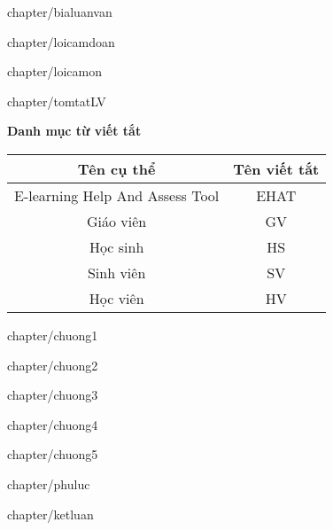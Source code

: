 \documentclass[12pt, a4paper, reqno, oneside]{report}
\begin{document}
	\makeatletter
	\renewcommand{\ps@myheadings}{
		\renewcommand{\@oddhead}{\textsf{Luận văn tốt nghiệp - công nghệ thông tin}\hfil\textrm{\thepage}}
		\renewcommand{\@oddfoot}{\textsf{Phan Minh Cường, Khoa Khoa học \& Kỹ thuật máy tính}\hfil}
	}
	
	\newpage
	 {chapter/bialuanvan}
	
	
	\newpage
	 {chapter/loicamdoan}
	
	\newpage
	 {chapter/loicamon}
	
	\newpage
	 {chapter/tomtatLV}
	
	\newpage
	\tableofcontents
	
	\newpage
	{\huge\bf Danh mục từ viết tắt} 
	
	\begin{center}
		\begin{table}[!htp]
			\centering
			\begin{tabular}{|c|c|}
				\hline 
				Tên cụ thể & Tên viết tắt \\ 
				\hline 
				E-learning Help And Assess Tool & EHAT \\ 
				\hline 
				Giáo viên & GV \\ 
				\hline 
				Học sinh & HS \\ 
				\hline 
				Sinh viên & SV \\ 
				\hline 
				Học viên & HV \\ 
				\hline 
			\end{tabular}
			\label{bang}
		\end{table}
	\end{center}
	
	\newpage
	\listoftables
	
	\newpage
	\listoffigures

	\newpage
	 {chapter/chuong1}
	
	\newpage
	 {chapter/chuong2}
	
	\newpage
	 {chapter/chuong3}
	
	\newpage
	 {chapter/chuong4}
	
	\newpage
	 {chapter/chuong5}
	
	\newpage
	 {chapter/phuluc}
	
	\newpage
	 {chapter/ketluan}
	
	\printbibliography
\end{document}
